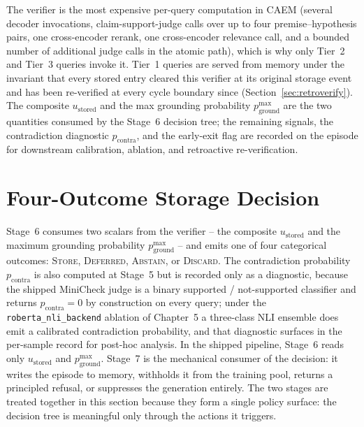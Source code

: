 The verifier is the most expensive per-query computation in CAEM (several decoder invocations, claim-support-judge calls over up to four premise--hypothesis pairs, one cross-encoder rerank, one cross-encoder relevance call, and a bounded number of additional judge calls in the atomic path), which is why only Tier~2 and Tier~3 queries invoke it. Tier~1 queries are served from memory under the invariant that every stored entry cleared this verifier at its original storage event and has been re-verified at every cycle boundary since (Section~\ref{sec:retroverify}). The composite $u_{\text{stored}}$ and the max grounding probability $p_{\text{ground}}^{\max}$ are the two quantities consumed by the Stage~6 decision tree; the remaining signals, the contradiction diagnostic $p_{\text{contra}}$, and the early-exit flag are recorded on the episode for downstream calibration, ablation, and retroactive re-verification.

\section{Four-Outcome Storage Decision}
\label{sec:decision}

Stage~6 consumes two scalars from the verifier -- the composite $u_{\text{stored}}$ and the maximum grounding probability $p_{\text{ground}}^{\max}$ -- and emits one of four categorical outcomes: \textsc{Store}, \textsc{Deferred}, \textsc{Abstain}, or \textsc{Discard}. The contradiction probability $p_{\text{contra}}$ is also computed at Stage~5 but is recorded only as a diagnostic, because the shipped MiniCheck judge is a binary supported / not-supported classifier and returns $p_{\text{contra}} = 0$ by construction on every query; under the \texttt{roberta\_nli\_backend} ablation of Chapter~5 a three-class NLI ensemble does emit a calibrated contradiction probability, and that diagnostic surfaces in the per-sample record for post-hoc analysis. In the shipped pipeline, Stage~6 reads only $u_{\text{stored}}$ and $p_{\text{ground}}^{\max}$. Stage~7 is the mechanical consumer of the decision: it writes the episode to memory, withholds it from the training pool, returns a principled refusal, or suppresses the generation entirely. The two stages are treated together in this section because they form a single policy surface: the decision tree is meaningful only through the actions it triggers.

